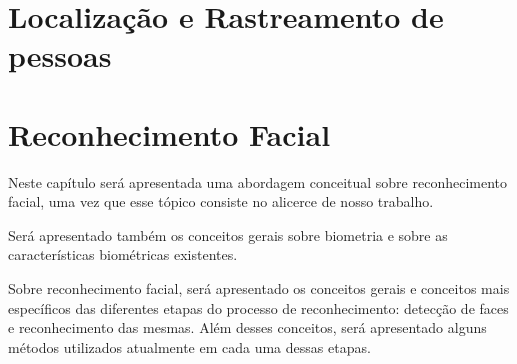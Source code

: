 
\chapter{Localização e Rastreamento de pessoas}


	

\chapter{Reconhecimento Facial}

	Neste capítulo será apresentada uma abordagem conceitual sobre reconhecimento facial, uma vez que esse tópico consiste no alicerce de nosso trabalho. 

	Será apresentado também os conceitos gerais sobre biometria e sobre as características biométricas existentes.

	Sobre reconhecimento facial, será apresentado os conceitos gerais e conceitos mais específicos das diferentes etapas do processo de reconhecimento: detecção de faces e reconhecimento das mesmas. Além desses conceitos, será apresentado alguns métodos utilizados atualmente em cada uma dessas etapas.


	
	






























